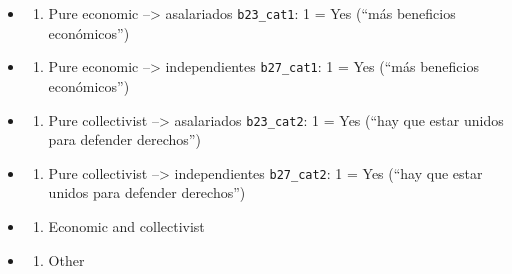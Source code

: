 \documentclass[
  letterpaper,
  DIV=11,
  numbers=noendperiod]{scrreprt}
\newenvironment{Shaded}{\begin{snugshade}}{\end{snugshade}}
\newcommand{\FunctionTok}[1]{\textcolor[rgb]{0.28,0.35,0.67}{#1}}
\newcommand{\NormalTok}[1]{\textcolor[rgb]{0.00,0.23,0.31}{#1}}
\newcommand{\SpecialCharTok}[1]{\textcolor[rgb]{0.37,0.37,0.37}{#1}}
\providecommand{\tightlist}{%
  \setlength{\itemsep}{0pt}\setlength{\parskip}{0pt}}
\begin{document}
\begin{itemize}
\tightlist
\item
  \begin{enumerate}
  \def\labelenumi{\arabic{enumi}.}
  \tightlist
  \item
    Pure economic --\textgreater{} asalariados \texttt{b23\_cat1}: 1 =
    Yes (``más beneficios económicos'')
  \end{enumerate}
\item
  \begin{enumerate}
  \def\labelenumi{\arabic{enumi}.}
  \tightlist
  \item
    Pure economic --\textgreater{} independientes \texttt{b27\_cat1}: 1
    = Yes (``más beneficios económicos'')
  \end{enumerate}
\item
  \begin{enumerate}
  \def\labelenumi{\arabic{enumi}.}
  \setcounter{enumi}{1}
  \tightlist
  \item
    Pure collectivist --\textgreater{} asalariados \texttt{b23\_cat2}: 1
    = Yes (``hay que estar unidos para defender derechos'')
  \end{enumerate}
\item
  \begin{enumerate}
  \def\labelenumi{\arabic{enumi}.}
  \setcounter{enumi}{1}
  \tightlist
  \item
    Pure collectivist --\textgreater{} independientes
    \texttt{b27\_cat2}: 1 = Yes (``hay que estar unidos para defender
    derechos'')
  \end{enumerate}
\item
  \begin{enumerate}
  \def\labelenumi{\arabic{enumi}.}
  \setcounter{enumi}{2}
  \tightlist
  \item
    Economic and collectivist
  \end{enumerate}
\item
  \begin{enumerate}
  \def\labelenumi{\arabic{enumi}.}
  \setcounter{enumi}{3}
  \tightlist
  \item
    Other
  \end{enumerate}
\end{itemize}

\begin{Shaded}
\end{Shaded}
\end{document}
